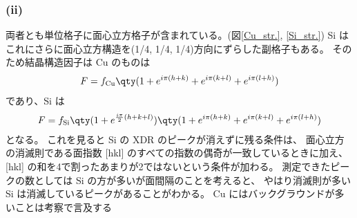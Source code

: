 \documentclass[11pt,dvipdfmx,a4paper]{jsarticle}
\begin{document}

\subsubsection*{(ii)}
両者とも単位格子に面心立方格子が含まれている。(図\ref{Cu_str.}, \ref{Si_str.})
Si はこれにさらに面心立方構造を(1/4, 1/4, 1/4)方向にずらした副格子もある。%
そのため結晶構造因子は Cu のものは
\begin{align}
	F = f_{\text{Cu}}\qty(1+e^{i\pi(h+k)}+e^{i\pi(k+l)}+e^{i\pi(l+h)})
\end{align}
であり、Si は
\begin{align}
	F = f_{\text{Si}}\qty(1+e^{\frac{i\pi}{2}(h+k+l)})\qty(1+e^{i\pi(h+k)}+e^{i\pi(k+l)}+e^{i\pi(l+h)})
\end{align}
となる。
これを見ると Si の XDR のピークが消えずに残る条件は、
面心立方の消滅則である面指数 [hkl] のすべての指数の偶奇が一致しているときに加え、
[hkl] の和を4で割ったあまりが2ではないという条件が加わる。
測定できたピークの数としては Si の方が多いが面間隔のことを考えると、
やはり消滅則が多い Si は消滅しているピークがあることがわかる。%
Cu にはバックグラウンドが多いことは考察で言及する\\ %
\end{document}
